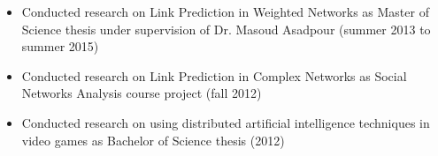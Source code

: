 \documentclass[margin, 10pt]{res} %
\begin{document}
\begin{resume}
\begin{itemize}[leftmargin=*]
\item Conducted research on Link Prediction in Weighted Networks as Master of Science thesis under
supervision of Dr. Masoud Asadpour (summer 2013 to summer 2015)
\item Conducted research on Link Prediction in Complex Networks as Social Networks Analysis course
project (fall 2012)
\item Conducted research on using distributed artificial intelligence techniques in video games as
Bachelor of Science thesis (2012)
\end{itemize}

\end{resume}
\end{document}
